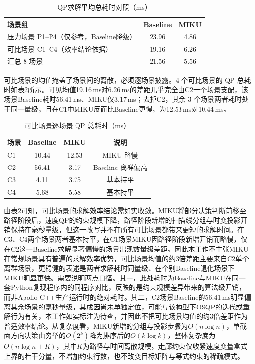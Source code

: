\documentclass[a4paper,11pt]{ctexart}
\theoremstyle{definition}
\begin{document}
\begin{table}[htbp]
\centering
\caption{QP求解平均总耗时对照（ms）}
\label{tab:exp_qp}
\small
\begin{tabular}{lcc}
\toprule
\textbf{场景组} & \textbf{Baseline} & \textbf{MIKU} \\
\midrule
压力场景 P1--P4（仅参考，Baseline降级） & 23.96 & 4.86 \\
可比场景 C1--C4（效率结论依据） & 19.16 & 6.26 \\
\midrule
汇总 8 场景 & 21.56 & 5.56 \\
\bottomrule
\end{tabular}
\end{table}

可比场景的均值掩盖了场景间的离散，必须逐场景披露。4 个可比场景的 QP 总耗时如表\ref{tab:exp_qp_percomp}所示。可见均值19.16\,ms对6.26\,ms的差距几乎完全由C2一个场景支配，该场景Baseline耗时56.41\,ms、MIKU仅3.17\,ms；去掉C2，其余 3 个场景两者耗时处于同一量级，且在C1中MIKU反而比Baseline更慢，为12.53\,ms对10.44\,ms。

\begin{table}[htbp]
\centering
\caption{可比场景逐场景 QP 总耗时（ms）}
\label{tab:exp_qp_percomp}
\small
\begin{tabular}{lccc}
\toprule
\textbf{场景} & \textbf{Baseline} & \textbf{MIKU} & \textbf{说明} \\
\midrule
C1 & 10.44 & 12.53 & MIKU 略慢 \\
C2 & 56.41 & 3.17 & Baseline 离群偏高 \\
C3 & 4.11 & 3.75 & 基本持平 \\
C4 & 5.68 & 5.58 & 基本持平 \\
\bottomrule
\end{tabular}
\end{table}

由表\ref{tab:exp_qp_percomp}可知，可比场景的求解效率结论需如实收敛。MIKU将部分决策判断前移至路径阶段后，速度QP的约束规模下降，路径阶段新增的扫描线分组与时变投影开销保持在毫秒量级，但这一改写并不在所有可比场景都带来更短的求解时间。在C3、C4两个场景两者基本持平，在C1场景MIKU因路径阶段新增开销而略慢，仅在C2这一Baseline求解显著偏慢的场景出现数量级差距。因此本工作不主张MIKU在常规场景具有普遍的求解效率优势，可比场景均值的约3倍差距主要来自C2单个离群场景，更稳健的表述是两者求解耗时同量级、在个别Baseline退化场景下MIKU明显更快。需要说明两点口径。其一，此处耗时为Baseline与MIKU在同一套Python复现程序内的同程序对比，反映的是约束规模差异带来的算法级开销，而非Apollo C++生产运行时的绝对耗时。其二，C2场景Baseline的56.41\,ms明显偏离其余场景的毫秒量级，其成因尚未单独定位，可能与该构型下OSQP的迭代或重解行为有关，本工作如实标注为待查，并因此不把可比场景均值的约3倍差距作为普适效率结论。从复杂度看，MIKU新增的分组与投影步骤为$O(n \log n)$，单截面方向决策由穷举的$O(2^k)$降为排序后的$O(k \log k)$，整体复杂度为$O(n \log n + K)$，其中$K$为路径与时间离散规模。走廊约束仅收紧速度变量盒式上界的若干分量，不增加约束行数，也不改变目标矩阵与等式约束的稀疏模式。
\end{document}
